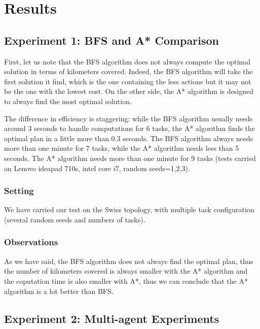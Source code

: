 \documentclass[11pt]{article}
\begin{document}
\section{Results}

\subsection{Experiment 1: BFS and A* Comparison}
First, let us note that the BFS algorithm does not always compute the optimal solution in terms of kilometers covered. Indeed, the BFS algorithm will take the first solution it find, which is the one containing the less actions but it may not be the one with the lowest cost. On the other side, the A* algorithm is designed to always find the most optimal solution.

The difference in efficiency is staggering: while the BFS algorithm usually needs around 3 seconds to handle computations for 6 tasks, the A* algorithm finds the optimal plan in a little more than 0.3 seconds. The BFS algorithm always needs more than one minute for 7 tasks, while the A* algorithm needs less than 5 seconds. The A* algorithm needs more than one minute for 9 tasks (tests carried on Lenovo ideapad 710s, intel core i7, random seeds=1,2,3). 

\subsubsection{Setting}
We have carried our test on the Swiss topology, with multiple task configuration (several random seeds and numbers of tasks).

\subsubsection{Observations}
As we have said, the BFS algorithm does not always find the optimal plan, thus the number of kilometers covered is always smaller with the A* algorithm and the coputation time is also smaller with A*, thus we can conclude that the A* algorithm is a lot better than BFS.

\subsection{Experiment 2: Multi-agent Experiments}
\end{document}
